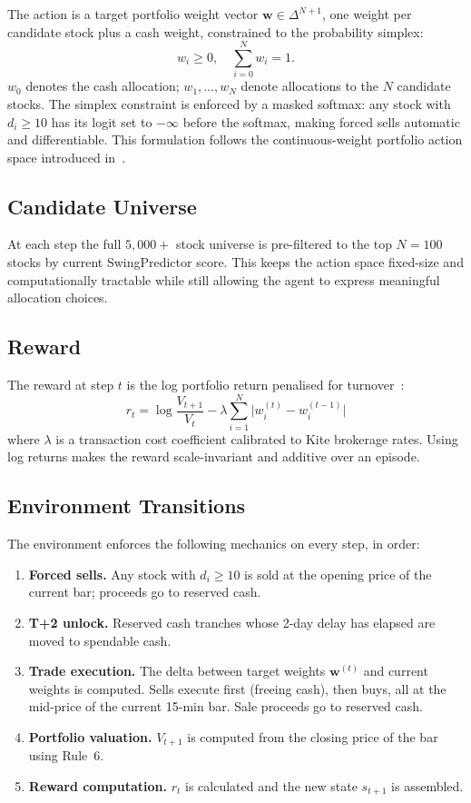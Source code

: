 \documentclass[11pt, a4paper]{article}
\begin{document}
The action is a target portfolio weight vector
$\mathbf{w} \in \Delta^{N+1}$, one weight per candidate stock plus a cash
weight, constrained to the probability simplex:
\[
    w_i \geq 0, \quad \sum_{i=0}^{N} w_i = 1.
\]
$w_0$ denotes the cash allocation; $w_1, \ldots, w_N$ denote allocations to
the $N$ candidate stocks. The simplex constraint is enforced by a masked
softmax: any stock with $d_i \geq 10$ has its logit set to $-\infty$ before
the softmax, making forced sells automatic and differentiable. This
formulation follows the continuous-weight portfolio action space introduced
in~\cite{jiang2017portfolio}.

\subsection{Candidate Universe}

At each step the full $5{,}000+$ stock universe is pre-filtered to the top
$N = 100$ stocks by current SwingPredictor score. This keeps the action space
fixed-size and computationally tractable while still allowing the agent to
express meaningful allocation choices.

\subsection{Reward}

The reward at step $t$ is the log portfolio return penalised for
turnover~\cite{almgren2001execution}:
\[
    r_t = \log\!\frac{V_{t+1}}{V_t} - \lambda \sum_{i=1}^{N}
          \bigl|w_i^{(t)} - w_i^{(t-1)}\bigr|
\]
where $\lambda$ is a transaction cost coefficient calibrated to Kite
brokerage rates. Using log returns makes the reward scale-invariant and
additive over an episode.

\subsection{Environment Transitions}

The environment enforces the following mechanics on every step, in order:

\begin{enumerate}[label=\roman*.]
    \item \textbf{Forced sells.} Any stock with $d_i \geq 10$ is sold at the
          opening price of the current bar; proceeds go to reserved cash.
    \item \textbf{T+2 unlock.} Reserved cash tranches whose 2-day delay has
          elapsed are moved to spendable cash.
    \item \textbf{Trade execution.} The delta between target weights
          $\mathbf{w}^{(t)}$ and current weights is computed. Sells execute
          first (freeing cash), then buys, all at the mid-price of the current
          15-min bar. Sale proceeds go to reserved cash.
    \item \textbf{Portfolio valuation.} $V_{t+1}$ is computed from the closing
          price of the bar using Rule~6.
    \item \textbf{Reward computation.} $r_t$ is calculated and the new state
          $s_{t+1}$ is assembled.
\end{enumerate}
\end{document}
